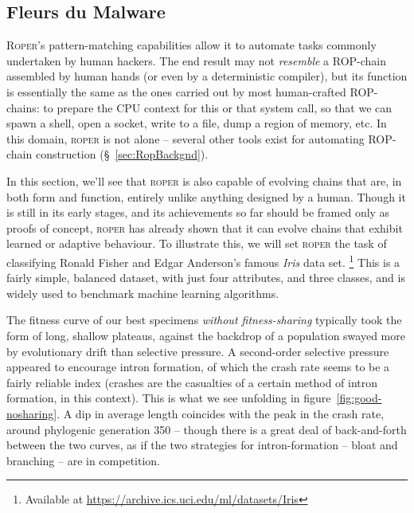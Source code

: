 
\subsection{Fleurs du Malware}
\textsc{Roper}'s pattern-matching capabilities allow it to
automate tasks commonly undertaken
by human hackers. The end result may not \emph{resemble} a
ROP-chain assembled by human hands (or even by a
deterministic compiler), but its function is essentially the same
as the ones carried out by most human-crafted ROP-chains:
to prepare the CPU context for this or that system call,
so that we can spawn a shell, open a socket, write to a file,
dump a region of memory, etc.  In this domain,
\textsc{roper} is not alone -- several other tools exist for
automating ROP-chain construction (\S~\ref{sec:RopBackgnd}). 

In this section, we'll see that \textsc{roper} is also capable of
evolving chains that are, in both form and function, entirely
unlike anything designed by a human. Though it is still in its
early stages, and its achievements so far should be framed only
as proofs of concept, \textsc{roper} has already shown that it
can evolve chains that exhibit learned or adaptive behaviour. 
To illustrate this, we will set \textsc{roper} the task of
classifying Ronald Fisher and Edgar Anderson's famous \emph{Iris}
data set.%
\footnote{Available at
\url{https://archive.ics.uci.edu/ml/datasets/Iris}}
This is a fairly simple, balanced dataset, with just four
attributes, and three classes, and is widely used to
benchmark machine learning algorithms.



The fitness curve of our best
specimens \textit{without fitness-sharing} typically took the form of long, shallow plateaus, against the backdrop of a population swayed more by evolutionary
drift than selective pressure.  A second-order selective pressure appeared to encourage intron formation,
of which the crash rate seems to be a fairly reliable index
(crashes are the casualties of a certain method of intron
formation, in this context). This is what we see unfolding in
figure~\ref{fig:good-nosharing}. A dip in average length coincides with the peak in the crash rate, around phylogenic generation 350 -- though there is a great deal of
back-and-forth between the two curves, as if the two strategies
for intron-formation -- bloat and branching -- are in competition.%

